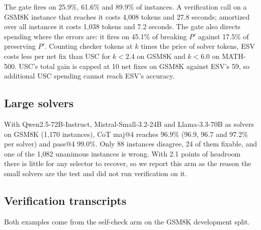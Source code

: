 \documentclass[letterpaper]{article} %
\begin{document}
The gate fires on 25.9\%, 61.6\% and 89.9\% of instances. A verification call on a GSM8K instance that reaches it costs 4{,}008 tokens and 27.8 seconds; amortized over all instances it costs 1{,}038 tokens and 7.2 seconds. The gate also directs spending where the errors are: it fires on 45.1\% of breaking $P'$ against 17.5\% of preserving $P'$. Counting checker tokens at $k$ times the price of solver tokens, ESV costs less per net fix than USC for $k < 2.4$ on GSM8K and $k < 6.0$ on MATH-500. USC's total gain is capped at 10 net fixes on GSM8K against ESV's 59, so additional USC spending cannot reach ESV's accuracy.

\subsection{Large solvers}
\label{app:large}

With Qwen2.5-72B-Instruct, Mistral-Small-3.2-24B and Llama-3.3-70B as solvers on GSM8K (1{,}170 instances), CoT maj@4 reaches 96.9\% (96.9, 96.7 and 97.2\% per solver) and pass@4 99.0\%. Only 88 instances disagree, 24 of them fixable, and one of the 1{,}082 unanimous instances is wrong. With 2.1 points of headroom there is little for any selector to recover, so we report this arm as the reason the small solvers are the test and did not run verification on it.

\subsection{Verification transcripts}
\label{app:transcripts}

Both examples come from the self-check arm on the GSM8K development split.

\noindent{}

\vspace{4pt}
\noindent{}
\end{document}
